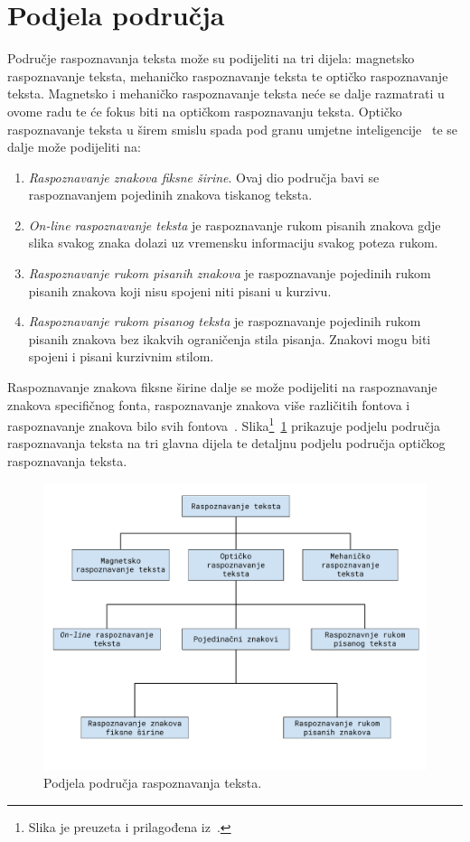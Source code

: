 \section{Podjela područja}
\label{sec:podjela-podrucja}
Područje raspoznavanja teksta može su podijeliti na tri dijela: magnetsko raspoznavanje teksta, mehaničko raspoznavanje
teksta te optičko raspoznavanje teksta. Magnetsko i mehaničko raspoznavanje teksta neće se dalje razmatrati u ovome
radu te će fokus biti na optičkom raspoznavanju teksta. Optičko raspoznavanje teksta u širem smislu spada pod granu
umjetne inteligencije\ \citep{mori1999} te se dalje može podijeliti na:
\begin{enumerate}
    \item \emph{Raspoznavanje znakova fiksne širine}. Ovaj dio područja bavi se raspoznavanjem pojedinih znakova
    tiskanog teksta.
    \item \emph{On-line raspoznavanje teksta} je raspoznavanje rukom pisanih znakova gdje slika svakog znaka dolazi uz
    vremensku informaciju svakog poteza rukom.
    \item \emph{Raspoznavanje rukom pisanih znakova} je raspoznavanje pojedinih rukom pisanih znakova koji nisu spojeni
    niti pisani u kurzivu.
    \item \emph{Raspoznavanje rukom pisanog teksta} je raspoznavanje pojedinih rukom pisanih znakova bez ikakvih
    ograničenja stila pisanja. Znakovi mogu biti spojeni i pisani kurzivnim stilom.
\end{enumerate}
Raspoznavanje znakova fiksne širine dalje se može podijeliti na raspoznavanje znakova specifičnog fonta, raspoznavanje
znakova više različitih fontova i raspoznavanje znakova bilo svih fontova\ \citep{govindan1989}.
Slika\footnote{Slika je preuzeta i prilagođena iz\ \citep{mantas1986}.}\ \ref{fig:podjela-podrucja-raspoznavanja-teksta}
prikazuje podjelu područja raspoznavanja teksta na tri glavna dijela te detaljnu podjelu područja optičkog raspoznavanja
teksta.
\begin{figure}[htb]
    \centering
    \includegraphics[width=12cm]{images/character-recognition-categories.pdf}
    \caption{Podjela područja raspoznavanja teksta.}
    \label{fig:podjela-podrucja-raspoznavanja-teksta}
\end{figure}

